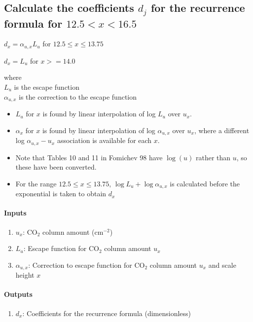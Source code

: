 \subsection{Calculate the coefficients $d_j$ for the recurrence formula 
    for $12.5 < x < 16.5$}

   $d_x = \alpha_{u,x}L_u$ for $12.5 \leq x \leq 13.75$

   \noindent $d_x = L_u$ for $x >= 14.0$
   
   \noindent where\\
   \noindent $L_u$ is the escape function\\
   \noindent $\alpha_{u,x}$ is the correction to the escape function 

   \begin{itemize}   
   \item $L_u$ for $x$ is found by linear interpolation of 
     log $L_u$ over $u_x$.
   \item $\alpha_x$ for $x$ is found by linear interpolation of 
     log $\alpha_{u,x}$ over $u_x$, where a different log $\alpha_{u,x}-u_x$
     association is available for each $x$.
   \item Note that Tables 10 and 11 in Fomichev 98 have $\log(u)$ rather 
     than $u$, so these have been converted.
   \item For the range $12.5 \leq x \leq 13.75$, $\log L_u + \log \alpha_{u,x}$
     is calculated before the exponential is taken to obtain $d_x$ 
   \end{itemize}
  
   \paragraph{Inputs}
   \begin{enumerate}
   \item $u_x$: CO$_2$ column amount (cm$^{-2}$)
   \item $L_u$: Escape function for CO$_2$ column amount $u_x$ 
   \item $\alpha_{u,x}$: Correction to escape function for CO$_2$ column 
     amount $u_x$ and scale height $x$ 
   \end{enumerate}

   \paragraph{Outputs}
   \begin{enumerate}
   \item $d_x$: Coefficients for the recurrence formula (dimensionless)
   \end{enumerate}

